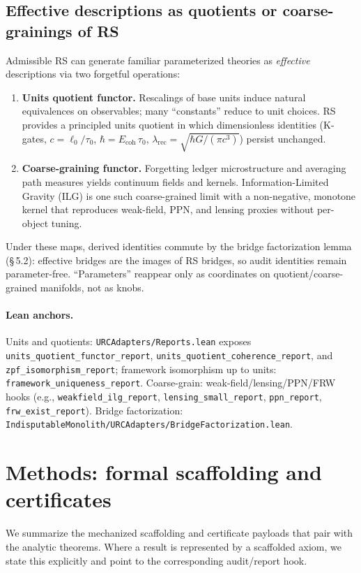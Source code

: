 \documentclass[11pt]{article}
\begin{document}
\subsection{Effective descriptions as quotients or coarse\mbox{-}grainings of RS}
Admissible RS can generate familiar parameterized theories as \emph{effective} descriptions via two forgetful operations:
\begin{enumerate}
  \item \textbf{Units quotient functor.} Rescalings of base units induce natural equivalences on observables; many ``constants'' reduce to unit choices. RS provides a principled units quotient in which dimensionless identities (K\mbox{-}gates, \(c=\ell_0/\tau_0\), \(\hbar=E_{\mathrm{coh}}\,\tau_0\), \(\lambda_{\mathrm{rec}}=\sqrt{\hbar G/(\pi c^3)}\)) persist unchanged.
  \item \textbf{Coarse\mbox{-}graining functor.} Forgetting ledger microstructure and averaging path measures yields continuum fields and kernels. Information\mbox{-}Limited Gravity (ILG) is one such coarse\mbox{-}grained limit with a non\mbox{-}negative, monotone kernel that reproduces weak\mbox{-}field, PPN, and lensing proxies without per\mbox{-}object tuning.
\end{enumerate}
Under these maps, derived identities commute by the bridge factorization lemma (\S\,5.2): effective bridges are the images of RS bridges, so audit identities remain parameter\mbox{-}free. ``Parameters'' reappear only as coordinates on quotient/coarse\mbox{-}grained manifolds, not as knobs.

\paragraph{Lean anchors.} Units and quotients: \texttt{URCAdapters/Reports.lean} exposes \texttt{units\_quotient\_functor\_report}, \texttt{units\_quotient\_coherence\_report}, and \texttt{zpf\_isomorphism\_report}; framework isomorphism up to units: \texttt{framework\_uniqueness\_report}. Coarse\mbox{-}grain: weak\mbox{-}field/lensing/PPN/FRW hooks (e.g., \texttt{weakfield\_ilg\_report}, \texttt{lensing\_small\_report}, \texttt{ppn\_report}, \texttt{frw\_exist\_report}). Bridge factorization: \texttt{IndisputableMonolith/URCAdapters/BridgeFactorization.lean}.

\section{Methods: formal scaffolding and certificates}
We summarize the mechanized scaffolding and certificate payloads that pair with the analytic theorems. Where a result is represented by a scaffolded axiom, we state this explicitly and point to the corresponding audit/report hook.
\end{document}
